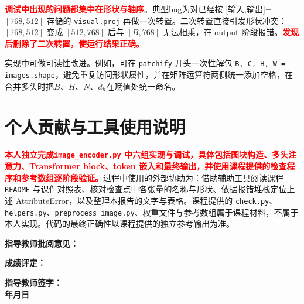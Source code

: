 \documentclass[a4paper,12pt]{article}
\newcommand{\studenthighlight}[1]{\textcolor{red}{\textbf{#1}}}
\begin{document}
\studenthighlight{调试中出现的问题都集中在形状与轴序}。典型bug为对已经按 [输入,输出]=$[768,512]$ 存储的 \texttt{visual.proj} 再做一次转置。二次转置直接引发形状冲突：$[768,512]$ 变成 $[512,768]$ 后与 $[B,768]$ 无法相乘，在 output 阶段报错。\studenthighlight{发现后删除了二次转置，使运行结果正确。}


实现中可做可读性改进。例如，可在 \texttt{patchify} 开头一次性解包 \texttt{B, C, H, W = images.shape}，避免重复访问形状属性，并在矩阵运算符两侧统一添加空格，在合并多头时把$B$、$H$、$N$、$d_h $在赋值处统一命名。


\section{个人贡献与工具使用说明}

\studenthighlight{本人独立完成\texttt{image\_encoder.py} 中六组实现与调试，具体包括图块构造、多头注意力、Transformer block、token 嵌入和最终输出，并使用课程提供的检查程序和参考数组逐阶段验证。}过程中使用的外部协助为：借助辅助工具阅读课程 \texttt{README} 与课件对照表、核对检查点中各张量的名称与形状、依据报错堆栈定位上述 AttributeError，以及整理本报告的文字与表格。课程提供的 \texttt{check.py}、\texttt{helpers.py}、\texttt{preprocess\_image.py}、权重文件与参考数组属于课程材料，不属于本人实现。代码的最终正确性以课程提供的独立参考输出为准。

\newpage



\vspace{1cm}

\noindent \textbf{指导教师批阅意见：}
\vspace{6cm}
\hfill

\vspace{1cm}

\noindent \textbf{成绩评定：}
\vspace{2cm}
\hfill

\vspace{1cm}

\begin{flushright}
\textbf{指导教师签字：}\quad\quad\quad\quad\quad\\[0.5cm]
\textbf{年}\quad\quad \textbf{月}\quad\quad \textbf{日}\quad
\end{flushright}
\end{document}
